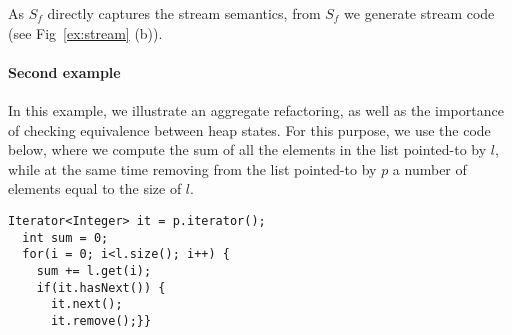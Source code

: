 \documentclass[runningheads,a4paper]{llncs}
\begin{document}



As $S_f$ directly captures the stream semantics,
from $S_f$ we generate 
stream code (see Fig~\ref{ex:stream} (b)).


\paragraph{Second example}
In this example, we illustrate an aggregate refactoring, as well as the
importance of checking equivalence between heap states.
For this purpose, we use the code below, where we 
compute the sum of all the elements in the list pointed-to by $l$, while 
at the same time removing from the list pointed-to by $p$ 
a number of elements equal to the size of $l$.

\begin{lstlisting}[mathescape=true]
  Iterator<Integer> it = p.iterator();  
  int sum = 0;
  for(i = 0; i<l.size(); i++) {
    sum += l.get(i);
    if(it.hasNext()) {
      it.next();
      it.remove();}}
\end{lstlisting}
\end{document}
